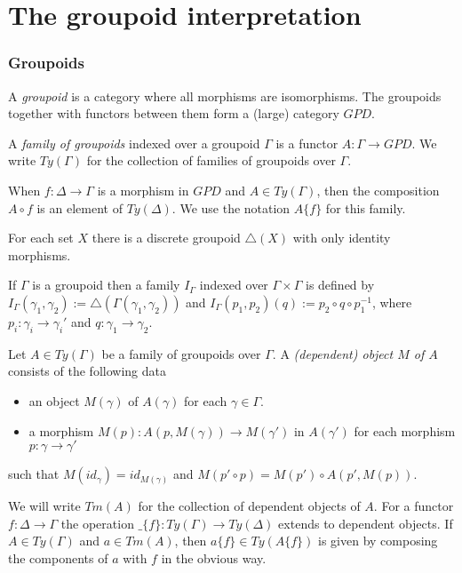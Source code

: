 \documentclass[handout,xcolor=dvipsnames]{beamer}
\begin{document}
\section{The groupoid interpretation}

\begin{frame}
  \frametitle{Groupoids}
\begin{definition}
A \emph{groupoid} is a category where all morphisms are isomorphisms. The
groupoids together with functors between them form a (large) category $GPD$. 
\end{definition}

\pause
\begin{definition}
A \emph{family of groupoids} indexed over a groupoid $\Gamma$ is a functor
$A:\Gamma\to GPD$. We write $Ty(\Gamma)$ for the collection of families of
groupoids over $\Gamma$. 
\end{definition}

\pause
When $f:\Delta\to\Gamma$ is a morphism in $GPD$ and $A\in Ty(\Gamma)$,
then the composition $A\circ f$ is an element of $Ty(\Delta)$. We use the
notation $A\{f\}$ for this family.
\end{frame}

\begin{frame}
\begin{example}
For each set $X$ there is a discrete groupoid $\triangle(X)$ with only identity
morphisms.

If $\Gamma$ is a groupoid then a family $I_\Gamma$ indexed over $\Gamma\times
\Gamma$ is defined by $I_\Gamma(\gamma_1,\gamma_2):=\triangle(\Gamma(\gamma_1,
\gamma_2))$ and $I_\Gamma(p_1,p_2)(q):= p_2\circ q \circ p_1^{-1}$, where
$p_i:\gamma_i\to\gamma_i'$ and $q:\gamma_1\to\gamma_2$.
\end{example}

\begin{definition}
Let $A\in Ty(\Gamma)$ be a family of groupoids over $\Gamma$. A
\emph{(dependent) object $M$ of $A$} consists of the following data
\begin{itemize}
\item an object $M(\gamma)$ of $A(\gamma)$ for each $\gamma\in\Gamma$.
\item a morphism $M(p):A(p,M(\gamma))\to M(\gamma')$ in $A(\gamma')$ for each
morphism $p:\gamma\to\gamma'$
\end{itemize}
such that $M(id_\gamma)=id_{M(\gamma)}$ and $M(p'\circ p)=M(p')\circ A(p',M(p))$.

We will write $Tm(A)$ for the collection of dependent objects of $A$. For a
functor $f:\Delta\to\Gamma$ the operation $\_\{f\}:Ty(\Gamma)\to Ty(\Delta)$
extends to dependent objects. If $A\in Ty(\Gamma)$ and $a\in Tm(A)$, then
$a\{f\}\in Ty(A\{f\})$ is given by composing the components of $a$ with $f$ in
the obvious way.
\end{definition}
\end{frame}
\end{document}
